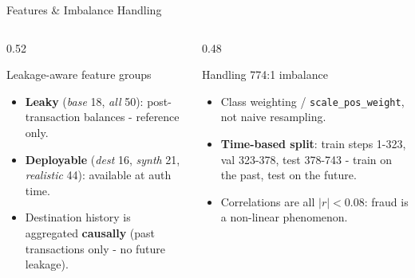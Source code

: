 \documentclass[t, aspectratio=169]{beamer} %
\begin{document}
\begin{frame}{Features \& Imbalance Handling}
	\begin{columns}[T]
		\begin{column}{0.52\textwidth}
			\begin{block}{Leakage-aware feature groups}
				\begin{itemize}
					\item \textbf{Leaky} (\emph{base} 18, \emph{all} 50):
					      post-transaction balances - reference only.
					\item \textbf{Deployable} (\emph{dest} 16, \emph{synth} 21,
					      \alert{\emph{realistic} 44}): available at auth time.
					\item Destination history is aggregated \textbf{causally}
					      (past transactions only - no future leakage).
				\end{itemize}
			\end{block}
		\end{column}
		\begin{column}{0.48\textwidth}
			\begin{block}{Handling 774:1 imbalance}
				\begin{itemize}
					\item Class weighting / \texttt{scale\_pos\_weight}, not naive
					      resampling.
					\item \textbf{Time-based split}: train steps 1-323, val
					      323-378, test 378-743 - train on the past, test on the
					      future.
					\item Correlations are all $|r|<0.08$: fraud is a
					      \alert{non-linear} phenomenon.
				\end{itemize}
			\end{block}
		\end{column}
	\end{columns}
\end{frame}
\end{document}

